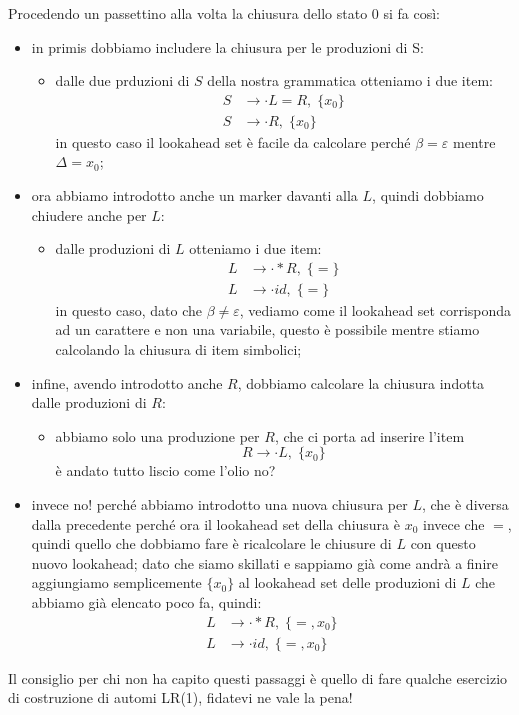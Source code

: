\documentclass[class=book, crop=false, oneside, 12pt]{standalone}
\begin{document}
Procedendo un passettino alla volta la chiusura dello stato 0 si fa così:
\begin{itemize}
    \item in primis dobbiamo includere la chiusura per le produzioni di S:
    \begin{itemize}
        \item dalle due prduzioni di \(S\) della nostra grammatica otteniamo i due item:
        \begin{align*}
            S &\to \cdot L = R,  \; \{x_0\} \\
            S &\to \cdot R,  \; \{x_0\}
        \end{align*}
        in questo caso il lookahead set è facile da calcolare perché \(\beta = \varepsilon\) mentre \(\Delta = x_0\);
    \end{itemize}
    \item ora abbiamo introdotto anche un marker davanti alla \(L\), quindi dobbiamo chiudere anche per \(L\):
    \begin{itemize}
        \item dalle produzioni di \(L\) otteniamo i due item:
        \begin{align*}
            L &\to \cdot *R, \; \{=\} \\
            L &\to \cdot id, \; \{=\}
        \end{align*}
        in questo caso, dato che \(\beta \neq \varepsilon\), vediamo come il lookahead set corrisponda ad un carattere e non una variabile, questo è possibile mentre stiamo calcolando la chiusura di item simbolici;
    \end{itemize}
    \item infine, avendo introdotto anche \(R\), dobbiamo calcolare la chiusura indotta dalle produzioni di \(R\):
    \begin{itemize}
        \item abbiamo solo una produzione per \(R\), che ci porta ad inserire l'item 
        \begin{equation*}
            R \to \cdot L, \; \{x_0\}
        \end{equation*}
        è andato tutto liscio come l'olio no?
    \end{itemize}
    \item invece no! perché abbiamo introdotto una nuova chiusura per \(L\), che è diversa dalla precedente perché ora il lookahead set della chiusura è \(x_0\) invece che \(=\), quindi quello che dobbiamo fare è ricalcolare le chiusure di \(L\) con questo nuovo lookahead; dato che siamo skillati e sappiamo già come andrà a finire aggiungiamo semplicemente \(\{x_0\}\) al lookahead set delle produzioni di \(L\) che abbiamo già elencato poco fa, quindi:
    \begin{align*}
        L &\to \cdot *R, \; \{=, x_0\} \\
        L &\to \cdot id, \; \{=, x_0\}
    \end{align*}
\end{itemize}
Il consiglio per chi non ha capito questi passaggi è quello di fare qualche esercizio di costruzione di automi LR(1), fidatevi ne vale la pena!
\end{document}
